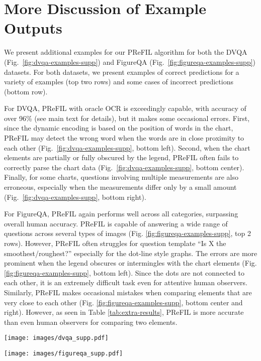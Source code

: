 \documentclass[10pt,twocolumn]{article}
\begin{document}
\section{More Discussion of Example Outputs}

We present additional examples for our PReFIL algorithm for both the DVQA \cite{kafle2018dvqa} (Fig.~\ref{fig:dvqa-examples-supp}) and FigureQA (Fig.~\ref{fig:figureqa-examples-supp}) datasets. For both datasets, we present examples of correct predictions for a variety of examples (top two rows) and some cases of incorrect predictions (bottom row).

For DVQA, PReFIL with oracle OCR is exceedingly capable, with accuracy of over 96\% (see main text for details), but it makes some occasional errors. First, since the dynamic encoding is based on the position of words in the chart, PReFIL may detect the wrong word when the words are in close proximity to each other (Fig.~\ref{fig:dvqa-examples-supp}, bottom left). Second, when the chart elements are partially or fully obscured by the legend, PReFIL often fails to correctly parse the chart data (Fig.~\ref{fig:dvqa-examples-supp}, bottom center). Finally, for some charts, questions involving multiple measurements are also erroneous, especially when the measurements differ only by a small amount (Fig.~\ref{fig:dvqa-examples-supp}, bottom right).

For FigureQA, PReFIL again performs well across all categories, surpassing overall human accuracy. PReFIL is capable of answering a wide range of questions across several types of images (Fig. \ref{fig:figureqa-examples-supp}, top 2 rows). However, PReFIL often struggles for question template ``Is X the smoothest/roughest?'' especially for the dot-line style graphs. The errors are more prominent when the legend obscures or intermingles with the chart elements (Fig. \ref{fig:figureqa-examples-supp}, bottom left). Since the dots are not connected to each other, it is an extremely difficult task even for attentive human observers. Similarly, PReFIL makes occasional mistakes when comparing elements that are very close to each other (Fig. \ref{fig:figureqa-examples-supp}, bottom center and right). However, as seen in Table \ref{tab:extra-results}, PReFIL is more accurate than even human observers for comparing two elements.

\begin{figure*}[!t]
    \centering
    \texttt{[image: images/dvqa\_supp.pdf]}
    \caption{Some example predictions for PReFIL on the DVQA dataset. Red denotes incorrect predictions. For incorrect predictions, correct answer is shown in parenthesis.  \label{fig:dvqa-examples-supp}}
\end{figure*}


\begin{figure*}[!t]
    \centering
    \texttt{[image: images/figureqa\_supp.pdf]}
    \caption{Some example predictions for PReFIL on the FigureQA dataset. Bottom row shows some incorrect predictions made by PReFIL. Red denotes incorrect predictions. For incorrect predictions, correct answer is shown in parenthesis.  \label{fig:figureqa-examples-supp}}
\end{figure*}
\end{document}
